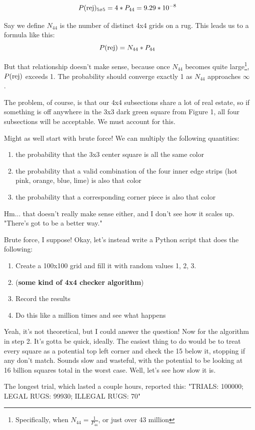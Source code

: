 \documentclass[12pt]{article}
\begin{document}
\begin{equation}
P(\hbox{rej})_{5x5} = 4 * P_{44} = 9.29 * 10^{-8}
\end{equation}

Say we define $N_{44}$ is the number of distinct 4x4 grids on a rug. This leads us to a formula like this:
\begin{equation}
P(\hbox{rej}) = N_{44} * P_{44}
\end{equation}

But that relationship doesn't make sense, because once $N_{44}$ becomes quite large\footnote{Specifically, when $N_{44} = \frac{1}{P_{44}}$, or just over 43 million}, $P(\hbox{rej})$ exceeds 1. The probability should converge exactly 1 as $N_{44}$ approaches $\infty$. 

The problem, of course, is that our 4x4 subsections share a lot of real estate, so if something is off anywhere in the 3x3 dark green square from Figure 1, all four subsections will be acceptable. We must account for this.

Might as well start with brute force! We can multiply the following quantities: 
\begin{enumerate}
  \item the probability that the 3x3 center square is all the same color
  \item the probability that a valid combination of the four inner edge strips (hot pink, orange, blue, lime) is also that color
  \item the probability that a corresponding corner piece is also that color
\end{enumerate}

Hm... that doesn't really make sense either, and I don't see how it scales up. "There's got to be a better way."

Brute force, I suppose! Okay, let's instead write a Python script that does the following:

\begin{enumerate}

\item Create a 100x100 grid and fill it with random values 1, 2, 3. 
\item (\textbf{some kind of 4x4 checker algorithm})
\item Record the results 
\item Do this like a million times and see what happens

\end{enumerate}

Yeah, it's not theoretical, but I could answer the question! Now for the algorithm in step 2. It's gotta be quick, ideally. The easiest thing to do would be to treat every square as a potential top left corner and check the 15 below it, stopping if any don't match. Sounds slow and wasteful, with the potential to be looking at 16 billion squares total in the worst case. Well, let's see how slow it is.

The longest trial, which lasted a couple hours, reported this: "TRIALS: 100000; LEGAL RUGS: 99930; ILLEGAL RUGS: 70"
\end{document}
